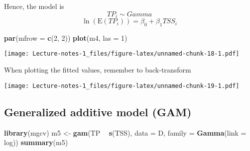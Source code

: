 \documentclass[
]{book}
\newenvironment{Shaded}{\begin{snugshade}}{\end{snugshade}}
\newcommand{\DataTypeTok}[1]{\textcolor[rgb]{0.13,0.29,0.53}{#1}}
\newcommand{\DecValTok}[1]{\textcolor[rgb]{0.00,0.00,0.81}{#1}}
\newcommand{\KeywordTok}[1]{\textcolor[rgb]{0.13,0.29,0.53}{\textbf{#1}}}
\newcommand{\NormalTok}[1]{#1}
\newcommand{\OperatorTok}[1]{\textcolor[rgb]{0.81,0.36,0.00}{\textbf{#1}}}
\newcommand{\OtherTok}[1]{\textcolor[rgb]{0.56,0.35,0.01}{#1}}
\newcommand{\StringTok}[1]{\textcolor[rgb]{0.31,0.60,0.02}{#1}}
\begin{document}
Hence, the model is
\[TP_i \sim Gamma\]
\[\ln(\text{E}(TP_i)) = \beta_0 + \beta_1 TSS_i\]

\begin{Shaded}
\begin{Highlighting}[]
\KeywordTok{par}\NormalTok{(}\DataTypeTok{mfrow =} \KeywordTok{c}\NormalTok{(}\DecValTok{2}\NormalTok{, }\DecValTok{2}\NormalTok{))}
\KeywordTok{plot}\NormalTok{(m4, }\DataTypeTok{las =} \DecValTok{1}\NormalTok{)}
\end{Highlighting}
\end{Shaded}

\texttt{[image: Lecture-notes-1\_files/figure-latex/unnamed-chunk-18-1.pdf]}

When plotting the fitted values, remember to back-transform

\begin{Shaded}
\end{Shaded}

\texttt{[image: Lecture-notes-1\_files/figure-latex/unnamed-chunk-19-1.pdf]}

\hypertarget{generalized-additive-model-gam-1}{%
\subsection{Generalized additive model (GAM)}\label{generalized-additive-model-gam-1}}

\begin{Shaded}
\begin{Highlighting}[]
\KeywordTok{library}\NormalTok{(mgcv)}
\NormalTok{m5 <-}\StringTok{ }\KeywordTok{gam}\NormalTok{(TP }\OperatorTok{~}\StringTok{ }\KeywordTok{s}\NormalTok{(TSS), }\DataTypeTok{data =}\NormalTok{ D, }\DataTypeTok{family =} \KeywordTok{Gamma}\NormalTok{(}\DataTypeTok{link =}\NormalTok{ log))}
\KeywordTok{summary}\NormalTok{(m5)}
\end{Highlighting}
\end{Shaded}
\end{document}
